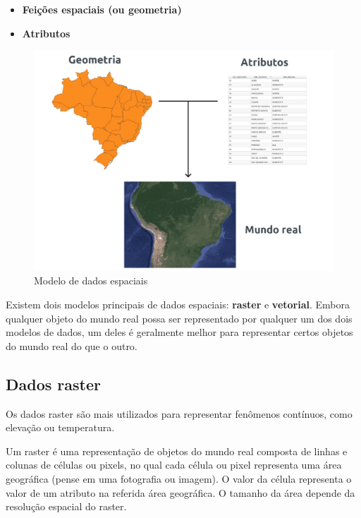 \documentclass[
]{krantz}
\providecommand{\tightlist}{%
  \setlength{\itemsep}{0pt}\setlength{\parskip}{0pt}}
\begin{document}
\begin{itemize}
\tightlist
\item
  \textbf{Feições espaciais (ou geometria)}
\item
  \textbf{Atributos}
\end{itemize}

\begin{figure}
\centering
\includegraphics{media/modulo0/spatial-model.png}
\caption{Modelo de dados espaciais}
\end{figure}

Existem dois modelos principais de dados espaciais: \textbf{raster} e \textbf{vetorial}. Embora qualquer objeto do mundo real possa ser representado por qualquer um dos dois modelos de dados, um deles é geralmente melhor para representar certos objetos do mundo real do que o outro.

\hypertarget{dados-raster}{%
\subsection{Dados raster}\label{dados-raster}}

Os dados raster são mais utilizados para representar fenômenos contínuos, como elevação ou temperatura.

Um raster é uma representação de objetos do mundo real composta de linhas e colunas de células ou pixels, no qual cada célula ou pixel representa uma área geográfica (pense em uma fotografia ou imagem). O valor da célula representa o valor de um atributo na referida área geográfica. O tamanho da área depende da resolução espacial do raster.
\end{document}
